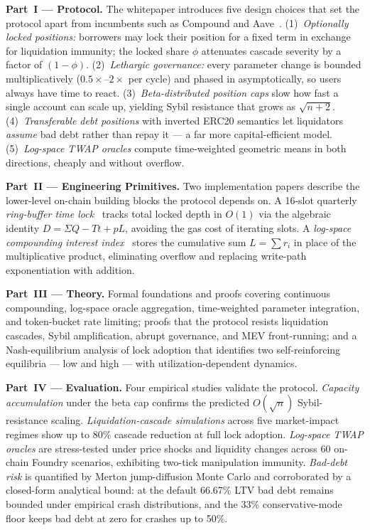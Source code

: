 \medskip
\noindent
\textbf{Part~I — Protocol.} The whitepaper introduces five design choices that set the protocol apart from incumbents such as Compound and Aave~\cite{compound2019,aave2020}. (1)~\emph{Optionally locked positions:} borrowers may lock their position for a fixed term in exchange for liquidation immunity; the locked share $\phi$ attenuates cascade severity by a factor of $(1{-}\phi)$. (2)~\emph{Lethargic governance:} every parameter change is bounded multiplicatively ($0.5\times$--$2\times$ per cycle) and phased in asymptotically, so users always have time to react. (3)~\emph{Beta-distributed position caps} slow how fast a single account can scale up, yielding Sybil resistance that grows as $\sqrt{n{+}2}$. (4)~\emph{Transferable debt positions} with inverted ERC20 semantics let liquidators \emph{assume} bad debt rather than repay it — a far more capital-efficient model. (5)~\emph{Log-space TWAP oracles} compute time-weighted geometric means in both directions, cheaply and without overflow.

\medskip
\noindent
\textbf{Part~II — Engineering Primitives.} Two implementation papers describe the lower-level on-chain building blocks the protocol depends on. A 16-slot quarterly \emph{ring-buffer time lock}~\cite{lck} tracks total locked depth in $O(1)$ via the algebraic identity $D = \Sigma Q - Tt + pL$, avoiding the gas cost of iterating slots. A \emph{log-space compounding interest index}~\cite{log} stores the cumulative sum $L = \sum r_i$ in place of the multiplicative product, eliminating overflow and replacing write-path exponentiation with addition.

\medskip
\noindent
\textbf{Part~III — Theory.} Formal foundations and proofs covering continuous compounding, log-space oracle aggregation, time-weighted parameter integration, and token-bucket rate limiting; proofs that the protocol resists liquidation cascades, Sybil amplification, abrupt governance, and MEV front-running; and a Nash-equilibrium analysis of lock adoption that identifies two self-reinforcing equilibria — low and high — with utilization-dependent dynamics.

\medskip
\noindent
\textbf{Part~IV — Evaluation.} Four empirical studies validate the protocol. \emph{Capacity accumulation} under the beta cap confirms the predicted $O(\sqrt{n})$ Sybil-resistance scaling. \emph{Liquidation-cascade simulations} across five market-impact regimes show up to 80\% cascade reduction at full lock adoption. \emph{Log-space TWAP oracles} are stress-tested under price shocks and liquidity changes across 60 on-chain Foundry scenarios, exhibiting two-tick manipulation immunity. \emph{Bad-debt risk} is quantified by Merton jump-diffusion Monte Carlo and corroborated by a closed-form analytical bound: at the default 66.67\% LTV bad debt remains bounded under empirical crash distributions, and the 33\% conservative-mode floor keeps bad debt at zero for crashes up to 50\%.

